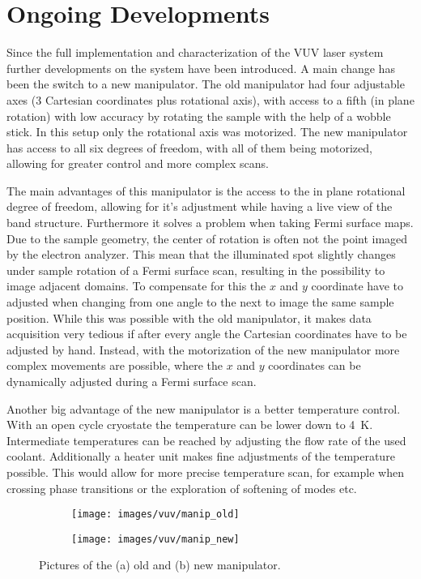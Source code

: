 

\section{Ongoing Developments}

Since the full implementation and characterization of the VUV laser system further developments on the system have been introduced.
A main change has been the switch to a new manipulator.
The old manipulator had four adjustable axes (3 Cartesian coordinates plus rotational axis), with access to a fifth (in plane rotation) with low accuracy by rotating the sample with the help of a wobble stick.
In this setup only the rotational axis was motorized.
The new manipulator has access to all six degrees of freedom, with all of them being motorized, allowing for greater control and more complex scans.

The main advantages of this manipulator is the access to the in plane rotational degree of freedom, allowing for it's adjustment while having a live view of the band structure.
Furthermore it solves a problem when taking Fermi surface maps.
Due to the sample geometry, the center of rotation is often not the point imaged by the electron analyzer.
This mean that the illuminated spot slightly changes under sample rotation of a Fermi surface scan, resulting in the possibility to image adjacent domains.
To compensate for this the $x$ and $y$ coordinate have to adjusted when changing from one angle to the next to image the same sample position.
While this was possible with the old manipulator, it makes data acquisition very tedious if after every angle the Cartesian coordinates have to be adjusted by hand.
Instead, with the motorization of the new manipulator more complex movements are possible, where the $x$ and $y$ coordinates can be dynamically adjusted during a Fermi surface scan.

Another big advantage of the new manipulator is a better temperature control.
With an open cycle cryostate the temperature can be lower down to \qty{4}{\kelvin}.
Intermediate temperatures can be reached by adjusting the flow rate of the used coolant.
Additionally a heater unit makes fine adjustments of the temperature possible.
This would allow for more precise temperature scan, for example when crossing phase transitions or the exploration of softening of modes etc.

\begin{figure}[h]
	\centering
	\begin{subfigure}[b]{0.46\textwidth}
		\texttt{[image: images/vuv/manip\_old]}
		\caption{}
	\end{subfigure}
	\begin{subfigure}[b]{0.46\textwidth}
		\texttt{[image: images/vuv/manip\_new]}
		\caption{}
	\end{subfigure}
	\caption{Pictures of the (a) old and (b) new manipulator.}
	\label{fig:manip_full}
\end{figure}

